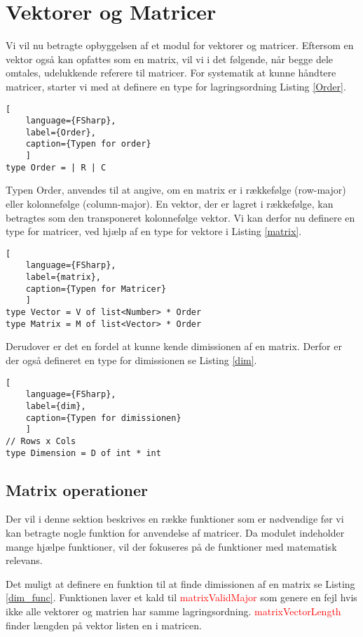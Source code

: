 \section{Vektorer og Matricer}
Vi vil nu betragte opbyggelsen af et modul for vektorer og matricer. Eftersom en vektor også kan opfattes som en matrix, vil vi i det følgende, når begge dele omtales, udelukkende referere til matricer. For systematik at kunne håndtere matricer, starter vi med at definere en type for lagringsordning Listing \ref{Order}.

\begin{lstlisting}[
    language={FSharp}, 
    label={Order}, 
    caption={Typen for order}
    ]
type Order = | R | C
\end{lstlisting}

Typen Order, anvendes til at angive, om en matrix er i rækkefølge (row-major) eller kolonnefølge (column-major). En vektor, der er lagret i rækkefølge, kan betragtes som den transponeret kolonnefølge vektor. Vi kan derfor nu definere en type for matricer, ved hjælp af en type for vektore i Listing \ref{matrix}.

\begin{lstlisting}[
    language={FSharp}, 
    label={matrix}, 
    caption={Typen for Matricer}
    ]
type Vector = V of list<Number> * Order
type Matrix = M of list<Vector> * Order
\end{lstlisting}

Derudover er det en fordel at kunne kende dimissionen af en matrix. Derfor er der også defineret en type for dimissionen se Listing \ref{dim}.

\begin{lstlisting}[
    language={FSharp}, 
    label={dim}, 
    caption={Typen for dimissionen}
    ]
// Rows x Cols
type Dimension = D of int * int
\end{lstlisting}


\subsection{Matrix operationer}
Der vil i denne sektion beskrives en række funktioner som er nødvendige før vi kan betragte nogle funktion for anvendelse af matricer. Da modulet indeholder mange hjælpe funktioner, vil der fokuseres på de funktioner med matematisk relevans.

Det muligt at definere en funktion til at finde dimissionen af en matrix se Listing \ref{dim_func}. Funktionen laver et kald til \textcolor{red}{matrixValidMajor} som genere en fejl hvis ikke alle vektorer og matrien har samme lagringsordning. \textcolor{red}{matrixVectorLength} finder længden på vektor listen en i matricen.

